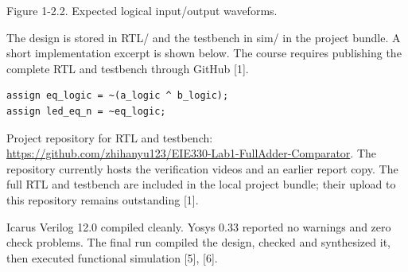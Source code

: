 \documentclass[10pt,a4paper]{article}
\begin{document}
{\small\raggedright Figure 1-2.2. Expected logical input/output waveforms.\par}

The design is stored in RTL/ and the testbench in sim/ in the project bundle. A short implementation excerpt is shown below. The course requires publishing the complete RTL and testbench through GitHub [1].\par

\begin{verbatim}
assign eq_logic = ~(a_logic ^ b_logic);
assign led_eq_n = ~eq_logic;
\end{verbatim}

{\small\raggedright Project repository for RTL and testbench: \url{https://github.com/zhihanyu123/EIE330-Lab1-FullAdder-Comparator}. The repository currently hosts the verification videos and an earlier report copy. The full RTL and testbench are included in the local project bundle; their upload to this repository remains outstanding [1].\par}

{\small\raggedright Icarus Verilog 12.0 compiled cleanly. Yosys 0.33 reported no warnings and zero check problems. The final run compiled the design, checked and synthesized it, then executed functional simulation [5], [6].\par}
\end{document}
